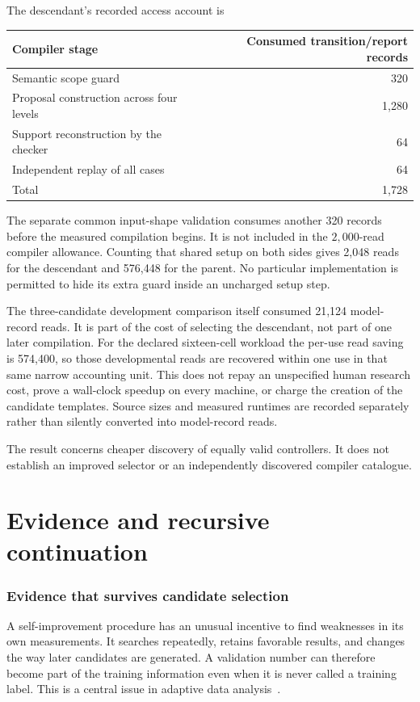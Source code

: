 \documentclass[11pt,letterpaper]{article}
\theoremstyle{plain}
\theoremstyle{definition}
\begin{document}
The descendant's recorded access account is
\begin{center}\begin{tabular}{@{}lr@{}}\toprule
Compiler stage & Consumed transition/report records\\\midrule
Semantic scope guard & 320\\
Proposal construction across four levels & 1,280\\
Support reconstruction by the checker & 64\\
Independent replay of all cases & 64\\\midrule
Total & 1,728\\\bottomrule
\end{tabular}\end{center}
The separate common input-shape validation consumes another 320 records before the measured compilation begins. It is not included in the $2{,}000$-read compiler allowance. Counting that shared setup on both sides gives 2,048 reads for the descendant and 576,448 for the parent. No particular implementation is permitted to hide its extra guard inside an uncharged setup step.

The three-candidate development comparison itself consumed 21,124 model-record reads. It is part of the cost of selecting the descendant, not part of one later compilation. For the declared sixteen-cell workload the per-use read saving is 574,400, so those developmental reads are recovered within one use in that same narrow accounting unit. This does not repay an unspecified human research cost, prove a wall-clock speedup on every machine, or charge the creation of the candidate templates. Source sizes and measured runtimes are recorded separately rather than silently converted into model-record reads.

The result concerns cheaper discovery of equally valid controllers. It does not establish an improved selector or an independently discovered compiler catalogue.

\clearpage\part{Evidence and recursive continuation}
\section{Evidence that survives candidate selection}\label{sec:evidence}
A self-improvement procedure has an unusual incentive to find weaknesses in its own measurements. It searches repeatedly, retains favorable results, and changes the way later candidates are generated. A validation number can therefore become part of the training information even when it is never called a training label. This is a central issue in adaptive data analysis~\cite{dwork}.
\end{document}

